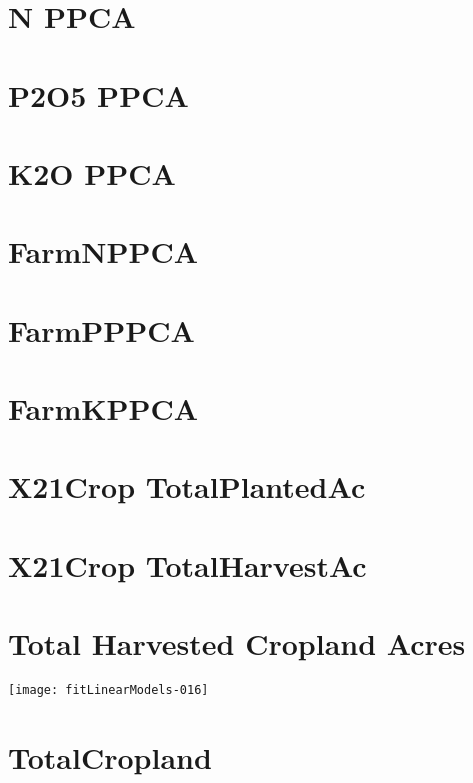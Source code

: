 \documentclass{report}
\begin{document}
\section*{N PPCA}

\section*{P2O5 PPCA}

\section*{K2O PPCA}

\section*{FarmNPPCA}

\section*{FarmPPPCA}

\section*{FarmKPPCA}

\section*{X21Crop TotalPlantedAc}

\section*{X21Crop TotalHarvestAc}

\section*{Total Harvested Cropland Acres}
\texttt{[image: fitLinearModels-016]}
\section*{TotalCropland}
\end{document}
